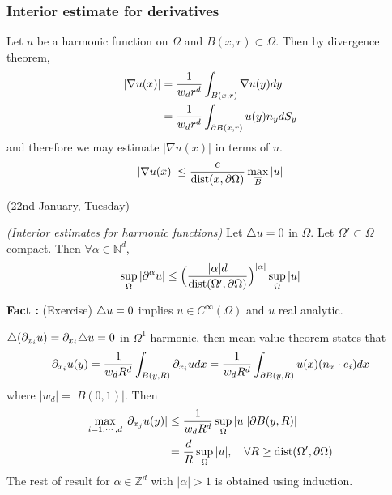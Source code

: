 \documentclass[12pt,a4paper]{article}
\newenvironment{proof}
{\begin{changemargin}{0.5cm}{0.5cm} 
	}%
	{\end{changemargin}
}
\newenvironment{p}
{\begin{proof} 
	}%
	{\end{proof}
}
\begin{document}
\subsubsection*{Interior estimate for derivatives}

Let $u$ be a harmonic function on $\Omega$ and $B(x, r) \subset \Omega$. Then by divergence theorem,
\begin{align*}
|\nabla u(x)| &= \frac{1}{w_d r^d} \int_{B(x, r)} \nabla u(y) dy \\
& = \frac{1}{w_d r^d} \int_{\partial B(x, r)} u(y) n_y dS_y
\end{align*}
and therefore we may estimate $|\nabla u(x)|$ in terms of $u$.
\begin{align*}
|\nabla u(x)| \leq \frac{c}{\text{dist}(x, \partial \Omega)} \max_{\overline{B}} |u|
\end{align*}
\s

\newday

(22nd January, Tuesday)
\s



 \emph{(Interior estimates for harmonic functions)} Let $\triangle u =0$ in $\Omega$. Let $\Omega' \subset \Omega$ compact. Then $\forall \alpha \in \mathbb{N}^d$,
\begin{align*}
\sup_{\Omega} |\partial^{\alpha}u| \leq \Big( \frac{|\alpha|d}{\text{dist}(\Omega', \partial \Omega)}\Big)^{|\alpha|} \sup_{\Omega} |u|
\end{align*}
\begin{p}
\textbf{Fact :} (Exercise) $\triangle u= 0$ implies $u\in C^{\infty}(\Omega)$ and $u$ real analytic.

\pf $\triangle(\partial_{x_i} u) = \partial_{x_i} \triangle u =0$ in $\Omega^1$ harmonic, then mean-value theorem states that
\begin{align*}
\partial_{x_i} u(y) = \frac{1}{w_d R^d} \int_{B(y ,R)} \partial_{x_i} u dx = \frac{1}{w_d R^d} \int_{\partial B(y, R)} u(x) (n_x \cdot e_i) dx
\end{align*}
where $|w_d| = |B(0,1)|$. Then
\begin{align*}
\max_{i=1, \cdots, d} |\partial_{x_{j}} u(y)| & \leq \frac{1}{w_d R^d} \sup_{\Omega} |u| |\partial B(y, R)|\\
& = \frac{d}{R} \sup_{\Omega}|u|, \quad \forall R \geq \text{dist}(\Omega', \partial \Omega)
\end{align*}
The rest of result for $\alpha \in \mathbb{Z}^d$ with $|\alpha|>1$ is obtained using induction.

\eop
\end{p}
\s
\end{document}
